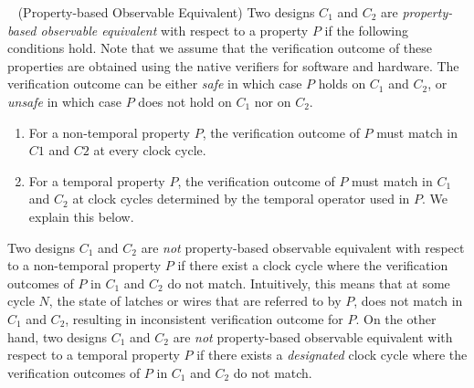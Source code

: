 \begin{definition}~\label{verilog-c-eq} (Property-based Observable Equivalent) 
  Two designs $C_1$ and $C_2$ are \emph{property-based observable equivalent} with
  respect to a property $P$ if the following conditions hold.  Note that we assume 
  that the verification outcome of these properties are obtained using the native 
  verifiers for software and hardware.  The verification outcome can be 
  either \emph{safe} in which case $P$ holds on $C_1$ and $C_2$, or \emph{unsafe} 
  in which case $P$ does not hold on $C_1$ nor on $C_2$. 
  \begin{enumerate}
    \item For a non-temporal property $P$, the verification outcome of $P$ must
      match in $C1$ and $C2$ at every clock cycle.  
   \item For a temporal property $P$, the verification outcome of $P$ must 
     match in $C_1$ and $C_2$ at clock cycles determined by the temporal 
     operator used in $P$.  We explain this below.  
  \end{enumerate}
\end{definition}
%
Two designs $C_1$ and $C_2$ are \emph{not} property-based observable equivalent 
with respect to a non-temporal property $P$ if there exist a clock cycle where 
the verification outcomes of $P$ in $C_1$ and $C_2$ do not match.  Intuitively, 
this means that at some cycle $N$, 
the state of latches or wires that are referred to by $P$, does not match in 
$C_1$ and $C_2$, resulting in inconsistent verification outcome for $P$. 
% 
On the other hand, two designs $C_1$ and $C_2$ are \emph{not} property-based observable equivalent 
with respect to a temporal property $P$ if there exists a \emph{designated} clock cycle 
where the verification outcomes of $P$ in $C_1$ and $C_2$ do not match.  



